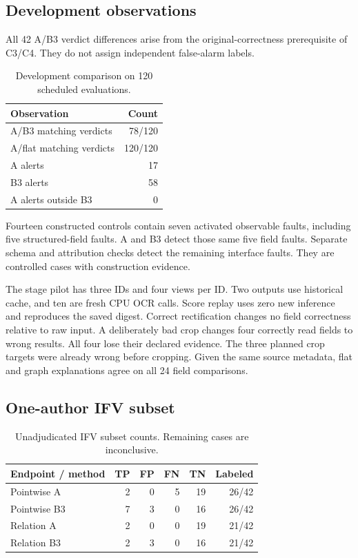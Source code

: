 \documentclass[sigconf,review,anonymous]{acmart}
\begin{document}
\subsection{Development observations}
All 42 A/B3 verdict differences arise from the original-correctness prerequisite of C3/C4. They do not assign independent false-alarm labels.

\begin{table}[t]
\centering
\caption{Development comparison on 120 scheduled evaluations.}
\label{tab:pilot}
\begin{tabular}{@{}lr@{}}
\toprule
Observation & Count\\
\midrule
A/B3 matching verdicts & 78/120\\
A/flat matching verdicts & 120/120\\
A alerts & 17\\
B3 alerts & 58\\
A alerts outside B3 & 0\\
\bottomrule
\end{tabular}
\end{table}

Fourteen constructed controls contain seven activated observable faults, including five structured-field faults. A and B3 detect those same five field faults. Separate schema and attribution checks detect the remaining interface faults. They are controlled cases with construction evidence.

The stage pilot has three IDs and four views per ID. Two outputs use historical cache, and ten are fresh CPU OCR calls. Score replay uses zero new inference and reproduces the saved digest. Correct rectification changes no field correctness relative to raw input. A deliberately bad crop changes four correctly read fields to wrong results. All four lose their declared evidence. The three planned crop targets were already wrong before cropping. Given the same source metadata, flat and graph explanations agree on all 24 field comparisons.

\subsection{One-author IFV subset}
\begin{table}[t]
\centering
\caption{Unadjudicated IFV subset counts. Remaining cases are inconclusive.}
\label{tab:ifv}
\begin{tabular}{@{}lrrrrr@{}}
\toprule
Endpoint / method & TP & FP & FN & TN & Labeled\\
\midrule
Pointwise A & 2 & 0 & 5 & 19 & 26/42\\
Pointwise B3 & 7 & 3 & 0 & 16 & 26/42\\
Relation A & 2 & 0 & 0 & 19 & 21/42\\
Relation B3 & 2 & 3 & 0 & 16 & 21/42\\
\bottomrule
\end{tabular}
\end{table}
\end{document}
